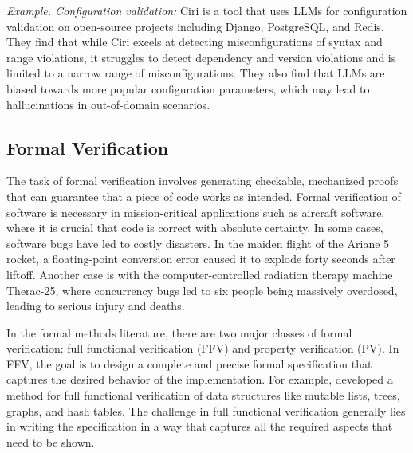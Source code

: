 \begin{tcolorbox}[colback=lightblue, boxrule=0pt, arc=10pt, outer arc=10pt]
\textit{Example. Configuration validation:} Ciri \citep{lian2024large} is a tool that uses LLMs for configuration validation on open-source projects including Django, PostgreSQL, and Redis. They find that while Ciri excels at detecting misconfigurations of syntax and range violations, it struggles to detect dependency and version violations and is limited to a narrow range of misconfigurations. They also find that LLMs are biased towards more popular configuration parameters, which may lead to hallucinations in out-of-domain scenarios. 
\end{tcolorbox}



\subsection{Formal Verification}

The task of formal verification involves generating checkable, mechanized proofs that can guarantee that a piece of code works as intended. Formal verification of software is necessary in mission-critical applications such as aircraft software, where it is crucial that code is correct with absolute certainty. In some cases, software bugs have led to costly disasters. In the maiden flight of the Ariane 5 rocket, a floating-point conversion error caused it to explode forty seconds after liftoff. Another case is with the computer-controlled radiation therapy machine Therac-25, where concurrency bugs led to six people being massively overdosed, leading to serious injury and deaths. 

In the formal methods literature, there are two major classes of formal verification: full functional verification (FFV) and property verification (PV). In FFV, the goal is to design a complete and precise formal specification that captures the desired behavior of the implementation. For example, \citet{zee2008full} developed a method for full functional verification of data structures like mutable lists, trees, graphs, and hash tables. The challenge in full functional verification generally lies in writing the specification in a way that captures all the required aspects that need to be shown.

